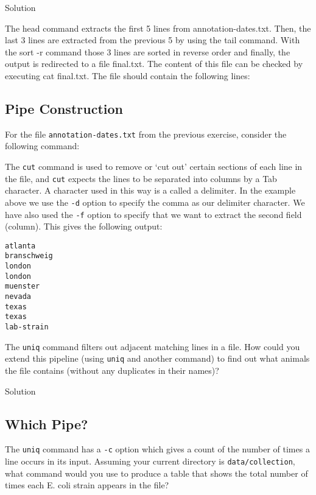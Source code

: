 \documentclass[
]{book}
\newenvironment{Shaded}{\begin{snugshade}}{\end{snugshade}}
\newcommand{\AttributeTok}[1]{\textcolor[rgb]{0.13,0.29,0.53}{#1}}
\newcommand{\ExtensionTok}[1]{#1}
\newcommand{\NormalTok}[1]{#1}
\begin{document}
Solution

The head command extracts the first 5 lines from annotation-dates.txt. Then, the last 3 lines are extracted from the previous 5 by using the tail command. With the sort -r command those 3 lines are sorted in reverse order and finally, the output is redirected to a file final.txt. The content of this file can be checked by executing cat final.txt. The file should contain the following lines:

\subsection{Pipe Construction}\label{pipe-construction}

For the file \texttt{annotation-dates.txt} from the previous exercise, consider the following command:

\begin{Shaded}
\end{Shaded}

The \texttt{cut} command is used to remove or `cut out' certain sections of each line in the file, and \texttt{cut} expects the lines to be separated into columns by a Tab character. A character used in this way is a called a delimiter. In the example above we use the \texttt{-d} option to specify the comma as our delimiter character. We have also used the \texttt{-f} option to specify that we want to extract the second field (column). This gives the following output:

\begin{verbatim}
atlanta
branschweig
london
london
muenster
nevada
texas
texas
lab-strain
\end{verbatim}

The \texttt{uniq} command filters out adjacent matching lines in a file. How could you extend this pipeline (using \texttt{uniq} and another command) to find out what animals the file contains (without any duplicates in their names)?

Solution

\subsection{Which Pipe?}\label{which-pipe}

The \texttt{uniq} command has a \texttt{-c} option which gives a count of the number of times a line occurs in its input. Assuming your current directory is \texttt{data/collection}, what command would you use to produce a table that shows the total number of times each E. coli strain appears in the file?
\end{document}
